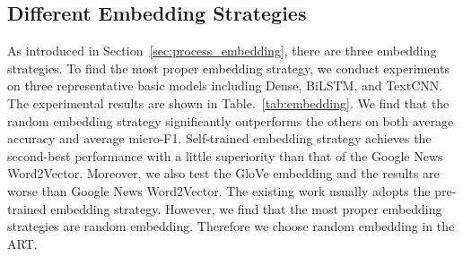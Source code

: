 \subsection{Different Embedding Strategies}
As introduced in Section~\ref{sec:process_embedding}, there are three embedding strategies. To find the most proper embedding strategy, we conduct experiments on three representative basic models including Dense, BiLSTM, and TextCNN. The experimental results are shown in Table.~\ref{tab:embedding}. We find that the random embedding strategy significantly outperforms the others on both average accuracy and average micro-F1. Self-trained embedding strategy achieves the second-best performance with a little superiority than that of the Google News Word2Vector. Moreover, we also test the GloVe embedding and the results are worse than Google News Word2Vector. The existing work usually adopts the pre-trained embedding strategy. However, we find that the most proper embedding strategies are random embedding. Therefore we choose random embedding in the ART.

\begin{table}[htbp]
	\caption{Results of Different Embedding Strategies}
	\centering
	\label{tab:embedding}
\end{table}

